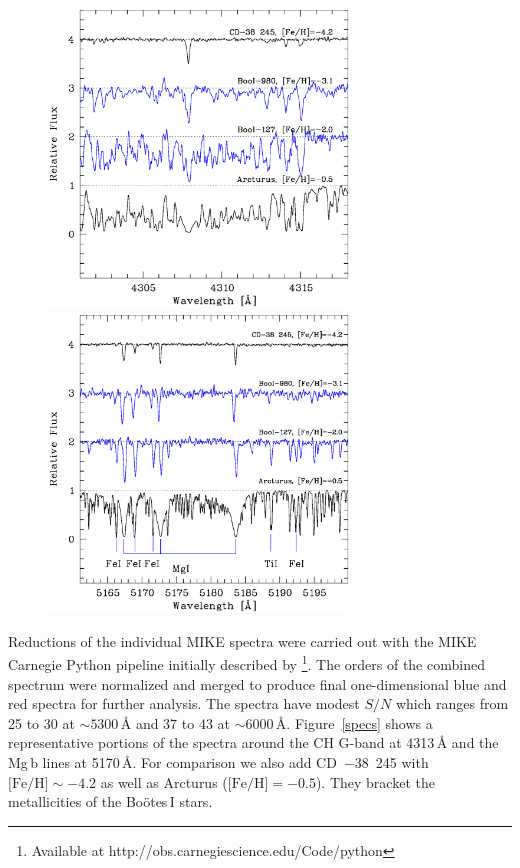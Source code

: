 \documentclass[]{emulateapj}
\begin{document}
\begin{figure}[!t]
 \begin{center}
  \includegraphics[clip=true,width=8cm, bbllx=44, bblly=124,
    bburx=558, bbury=598]{bootes_stars_ch_region.ps}
  \includegraphics[clip=true,width=8cm, bbllx=44, bblly=124,
    bburx=558, bbury=598]{bootes_stars_mg_region.ps}
 \end{center}
\end{figure}


Reductions of the individual MIKE spectra were carried out with the
MIKE Carnegie Python pipeline initially described by
\citet{kelson03}\footnote{Available at
  http://obs.carnegiescience.edu/Code/python}.  The orders of the
combined spectrum were normalized and merged to produce final
one-dimensional blue and red spectra for further analysis. The spectra
have modest $S/N$ which ranges from 25 to 30 at $\sim5300$\,{\AA} and
37 to 43 at $\sim6000$\,{\AA}. Figure~\ref{specs} shows a
representative portions of the spectra around the CH G-band at
4313\,{\AA} and the Mg\,b lines at 5170\,{\AA}. For comparison we also
add CD~$-$38~245 with $\mbox{[Fe/H]}\sim-4.2$ as well as Arcturus
($\mbox{[Fe/H]}=-0.5$). They bracket the metallicities of the
Bo\"otes\,I stars.
\end{document}

